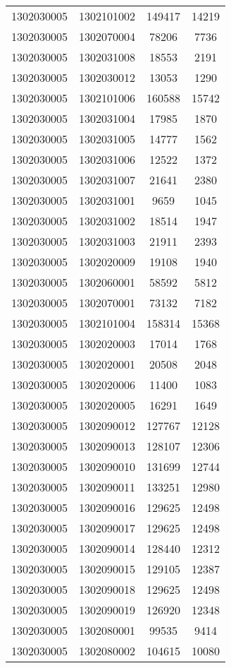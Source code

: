 \begin{longtable}[h]{llcc}
		1302030005 & 1302101002 & 149417 & 14219\\
		1302030005 & 1302070004 & 78206 & 7736\\
		1302030005 & 1302031008 & 18553 & 2191\\
		1302030005 & 1302030012 & 13053 & 1290\\
		1302030005 & 1302101006 & 160588 & 15742\\
		1302030005 & 1302031004 & 17985 & 1870\\
		1302030005 & 1302031005 & 14777 & 1562\\
		1302030005 & 1302031006 & 12522 & 1372\\
		1302030005 & 1302031007 & 21641 & 2380\\
		1302030005 & 1302031001 & 9659 & 1045\\
		1302030005 & 1302031002 & 18514 & 1947\\
		1302030005 & 1302031003 & 21911 & 2393\\
		1302030005 & 1302020009 & 19108 & 1940\\
		1302030005 & 1302060001 & 58592 & 5812\\
		1302030005 & 1302070001 & 73132 & 7182\\
		1302030005 & 1302101004 & 158314 & 15368\\
		1302030005 & 1302020003 & 17014 & 1768\\
		1302030005 & 1302020001 & 20508 & 2048\\
		1302030005 & 1302020006 & 11400 & 1083\\
		1302030005 & 1302020005 & 16291 & 1649\\
		1302030005 & 1302090012 & 127767 & 12128\\
		1302030005 & 1302090013 & 128107 & 12306\\
		1302030005 & 1302090010 & 131699 & 12744\\
		1302030005 & 1302090011 & 133251 & 12980\\
		1302030005 & 1302090016 & 129625 & 12498\\
		1302030005 & 1302090017 & 129625 & 12498\\
		1302030005 & 1302090014 & 128440 & 12312\\
		1302030005 & 1302090015 & 129105 & 12387\\
		1302030005 & 1302090018 & 129625 & 12498\\
		1302030005 & 1302090019 & 126920 & 12348\\
		1302030005 & 1302080001 & 99535 & 9414\\
		1302030005 & 1302080002 & 104615 & 10080\\

\end{longtable}
